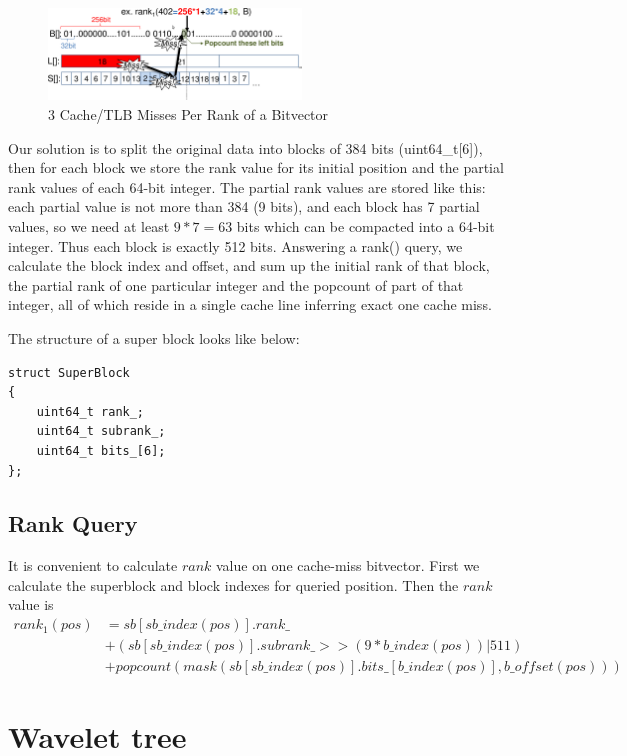 \begin{figure}[h!]
\centerline{\includegraphics[width=0.6\textwidth]{Figures/cachemisses.png}}
\caption{3 Cache/TLB Misses Per Rank of a Bitvector}\label{fig:cachemisses}
\end{figure}


Our solution is to split the original data into blocks of 384 bits (uint64\_t[6]), then for each block we store the rank value for its initial position and the partial rank values of each 64-bit integer. The partial rank values are stored like this: each partial value is not more than 384 (9 bits), and each block has 7 partial values, so we need at least \(9*7=63\) bits which can be compacted into a 64-bit integer. Thus each block is exactly 512 bits. Answering a rank() query, we calculate the block index and offset, and sum up the initial rank of that block, the partial rank of one particular integer and the popcount of part of that integer, all of which reside in a single cache line inferring exact one cache miss.

The structure of a super block looks like below:
\begin{lstlisting}
struct SuperBlock
{
    uint64_t rank_;
    uint64_t subrank_;
    uint64_t bits_[6];
};
\end{lstlisting}

\subsection{Rank Query}

It is convenient to calculate \(rank\) value on one cache-miss bitvector. First we calculate the superblock and block indexes for queried position. Then the \(rank\) value is
\begin{align*}
  rank_1(pos) &= sb[sb\_index(pos)].rank\_ \\
              &+ (sb[sb\_index(pos)].subrank\_ >> (9 * b\_index(pos)) | 511) \\
              &+ popcount(mask(sb[sb\_index(pos)].bits\_[b\_index(pos)], b\_offset(pos)))
\end{align*}

\section{Wavelet tree}

